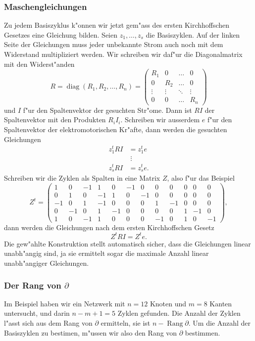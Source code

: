 \subsubsection{Maschengleichungen}
Zu jedem Basiszyklus k"onnen wir jetzt gem"ass des ersten
Kirchhoffschen Gesetzes eine Gleichung bilden.
Seien $z_1,\dots,z_s$ die Basiszyklen.
Auf der linken Seite der Gleichungen muss jeder unbekannte Strom
auch noch mit dem Widerstand multipliziert werden.
Wir schreiben wir daf"ur die Diagonalmatrix
mit den Widerst"anden
\[
R=
\operatorname{diag}(R_1,R_2,\dots,R_n)=
\begin{pmatrix}
R_1&0&\dots&0\\
0&R_2&\dots&0\\
\vdots&\vdots&\ddots&\vdots\\
0&0&\dots&R_n
\end{pmatrix}
\]
und
$I$ f"ur den Spaltenvektor der gesuchten Str"ome. Dann ist $RI$
der Spaltenvektor mit den Produkten $R_iI_i$.
Schreiben wir ausserdem $e$ f"ur den
Spaltenvektor der elektromotorischen Kr"afte, dann 
werden die gesuchten Gleichungen
\begin{align*}
z_1^tRI&=z_1^te\\
&\;\vdots\\
z_s^tRI&=z_s^te.
\end{align*}
Schreiben wir die Zyklen als Spalten in eine Matrix $Z$, also f"ur das
Beispiel
\[
Z^t=
\begin{pmatrix}
1&0&-1&1&0&-1&0&0&0&0&0&0\\
0&1&0&-1&1&0&-1&0&0&0&0&0\\
-1&0&1&-1&0&0&0&1&-1&0&0&0\\
0&-1&0&1&-1&0&0&0&0&1&-1&0\\
1&0&-1&1&0&0&0&-1&0&1&0&-1
\end{pmatrix},
\]
dann werden die Gleichungen nach dem ersten Kirchhoffschen Gesetz
\[
Z^tRI=Z^te.
\]
Die gew"ahlte Konstruktion stellt automatisch sicher, dass die
Gleichungen linear unabh"angig sind, ja sie ermittelt sogar
die maximale Anzahl linear unabh"angiger Gleichungen.

\subsubsection{Der Rang von $\partial$}
Im Beispiel haben wir ein Netzwerk mit $n=12$ Knoten und $m=8$
Kanten untersucht, und darin $n-m+1=5$ Zyklen gefunden. Die Anzahl
der Zyklen l"asst sich aus dem Rang von $\partial$ ermitteln,
sie ist $n-\operatorname{Rang}\partial$. Um die Anzahl der
Basiszyklen zu bestimen, m"ussen wir also den Rang von $\partial$
bestimmen.


